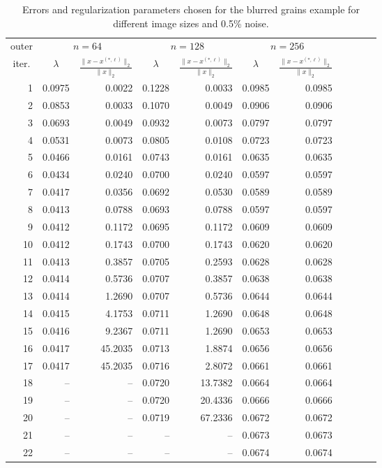 \begin{table}[htp]
\caption{Errors and regularization parameters chosen for the blurred grains example for different image sizes and 0.5\% noise.}
\begin{center}
\begin{tabular}{|r|r|r|r|r|r|r|r|r|r|r|}
\hline
\multicolumn{1}{|c|}{outer} & \multicolumn{2}{c|}{$n = 64$} & \multicolumn{2}{c|}{$n = 128$} & \multicolumn{2}{c|}{$n = 256$} \\\cline{2-7}
\multicolumn{1}{|c|}{iter.} & \multicolumn{1}{c|}{$\lambda$} & \multicolumn{1}{c|}{$\frac{\|x - x^{(*,\ell)}\|_2}{\|x\|_2}$} & \multicolumn{1}{c|}{$\lambda$} & \multicolumn{1}{c|}{$\frac{\|x - x^{(*,\ell)}\|_2}{\|x\|_2}$}  & \multicolumn{1}{c|}{$\lambda$} & \multicolumn{1}{c|}{$\frac{\|x - x^{(*,\ell)}\|_2}{\|x\|_2}$} \\
\hline
1 & 0.0975 & 0.0022 & 0.1228 & 0.0033 & 0.0985 & 0.0985 \\
2 & 0.0853 & 0.0033 & 0.1070 & 0.0049 & 0.0906 & 0.0906 \\
3 & 0.0693 & 0.0049 & 0.0932 & 0.0073 & 0.0797 & 0.0797 \\
4 & 0.0531 & 0.0073 & 0.0805 & 0.0108 & 0.0723 & 0.0723 \\
5 & 0.0466 & 0.0161 & 0.0743 & 0.0161 & 0.0635 & 0.0635 \\
6 & 0.0434 & 0.0240 & 0.0700 & 0.0240 & 0.0597 & 0.0597 \\
7 & 0.0417 & 0.0356 & 0.0692 & 0.0530 & 0.0589 & 0.0589 \\
8 & 0.0413 & 0.0788 & 0.0693 & 0.0788 & 0.0597 & 0.0597 \\
9 & 0.0412 & 0.1172 & 0.0695 & 0.1172 & 0.0609 & 0.0609 \\
10 & 0.0412 & 0.1743 & 0.0700 & 0.1743 & 0.0620 & 0.0620 \\
11 & 0.0413 & 0.3857 & 0.0705 & 0.2593 & 0.0628 & 0.0628 \\
12 & 0.0414 & 0.5736 & 0.0707 & 0.3857 & 0.0638 & 0.0638 \\
13 & 0.0414 & 1.2690 & 0.0707 & 0.5736 & 0.0644 & 0.0644 \\
14 & 0.0415 & 4.1753 & 0.0711 & 1.2690 & 0.0648 & 0.0648 \\
15 & 0.0416 & 9.2367 & 0.0711 & 1.2690 & 0.0653 & 0.0653 \\
16 & 0.0417 & 45.2035 & 0.0713 & 1.8874 & 0.0656 & 0.0656 \\
17 & 0.0417 & 45.2035 & 0.0716 & 2.8072 & 0.0661 & 0.0661 \\
18 & -- & -- & 0.0720 & 13.7382 & 0.0664 & 0.0664 \\
19 & -- & -- & 0.0720 & 20.4336 & 0.0666 & 0.0666 \\
20 & -- & -- & 0.0719 & 67.2336 & 0.0672 & 0.0672 \\
21 & -- & -- & -- & -- & 0.0673 & 0.0673 \\
22 & -- & -- & -- & -- & 0.0674 & 0.0674 \\\hline
\end{tabular}
\end{center}
\label{tab:grains_blurring_errs_and_reg_params}
\end{table}%
